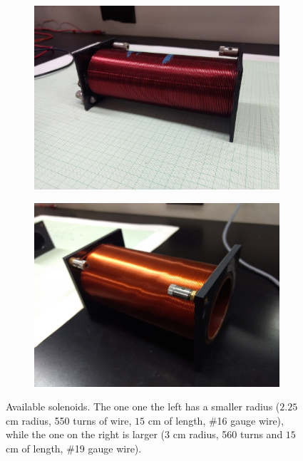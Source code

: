 \documentclass[12pt]{report}
\begin{document}
\begin{figure}[h]
\centering
\begin{subfigure}{0.45 \textwidth}
\includegraphics[width=\textwidth]{lab3-sessiona-solenoid1}
\end{subfigure}
\begin{subfigure}{0.45 \textwidth}
\includegraphics[width=\textwidth]{lab3-sessiona-solenoid2}
\end{subfigure}
\caption{Available solenoids. The one one the left has a smaller radius ($2.25$ cm radius, 550 turns of wire, $15$ cm of length, \#16 gauge wire), while the one on the right is larger ($3$ cm radius, 560 turns and $15$ cm of length, \#19 gauge wire).}
\label{Fig:lab3-sessiona-solenoids}
\end{figure}
\end{document}
